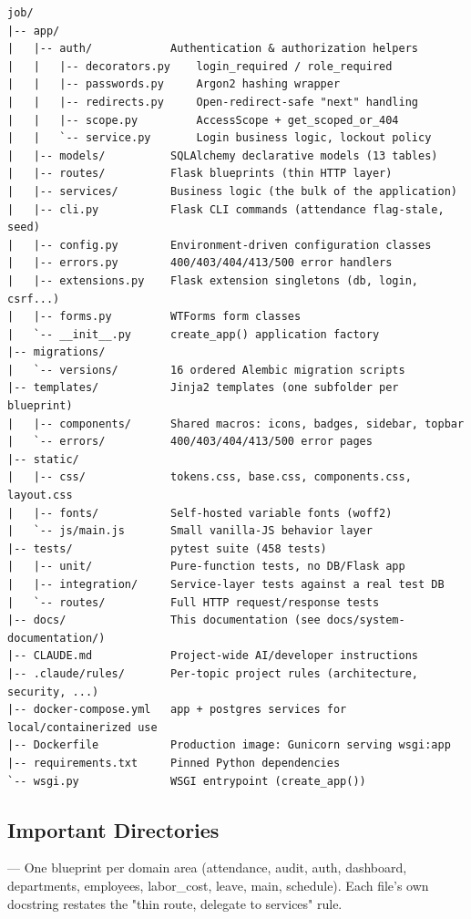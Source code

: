 \begin{lstlisting}[basicstyle=\ttfamily\footnotesize,frame=single]
job/
|-- app/
|   |-- auth/            Authentication & authorization helpers
|   |   |-- decorators.py    login_required / role_required
|   |   |-- passwords.py     Argon2 hashing wrapper
|   |   |-- redirects.py     Open-redirect-safe "next" handling
|   |   |-- scope.py         AccessScope + get_scoped_or_404
|   |   `-- service.py       Login business logic, lockout policy
|   |-- models/          SQLAlchemy declarative models (13 tables)
|   |-- routes/          Flask blueprints (thin HTTP layer)
|   |-- services/        Business logic (the bulk of the application)
|   |-- cli.py           Flask CLI commands (attendance flag-stale, seed)
|   |-- config.py        Environment-driven configuration classes
|   |-- errors.py        400/403/404/413/500 error handlers
|   |-- extensions.py    Flask extension singletons (db, login, csrf...)
|   |-- forms.py         WTForms form classes
|   `-- __init__.py      create_app() application factory
|-- migrations/
|   `-- versions/        16 ordered Alembic migration scripts
|-- templates/           Jinja2 templates (one subfolder per blueprint)
|   |-- components/      Shared macros: icons, badges, sidebar, topbar
|   `-- errors/          400/403/404/413/500 error pages
|-- static/
|   |-- css/             tokens.css, base.css, components.css, layout.css
|   |-- fonts/           Self-hosted variable fonts (woff2)
|   `-- js/main.js       Small vanilla-JS behavior layer
|-- tests/               pytest suite (458 tests)
|   |-- unit/            Pure-function tests, no DB/Flask app
|   |-- integration/     Service-layer tests against a real test DB
|   `-- routes/          Full HTTP request/response tests
|-- docs/                This documentation (see docs/system-documentation/)
|-- CLAUDE.md            Project-wide AI/developer instructions
|-- .claude/rules/       Per-topic project rules (architecture, security, ...)
|-- docker-compose.yml   app + postgres services for local/containerized use
|-- Dockerfile           Production image: Gunicorn serving wsgi:app
|-- requirements.txt     Pinned Python dependencies
`-- wsgi.py              WSGI entrypoint (create_app())
\end{lstlisting}

\subsection*{Important Directories}

\textbf{} --- One blueprint per domain area
(attendance, audit, auth, dashboard, departments, employees,
labor\_cost, leave, main, schedule). Each file's own docstring restates
the "thin route, delegate to services" rule.

